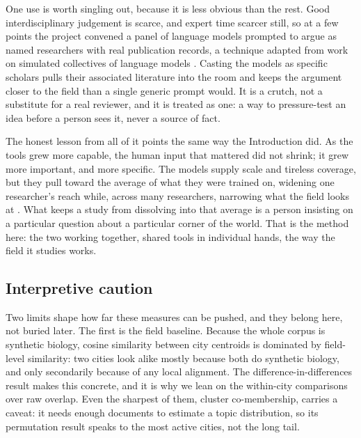 \documentclass[12pt,a4paper]{article}
\begin{document}
	One use is worth singling out, because it is less obvious than the rest. Good
	interdisciplinary judgement is scarce, and expert time scarcer still, so at a few
	points the project convened a panel of language models prompted to argue as named
	researchers with real publication records, a technique adapted from work on
	simulated collectives of language models \citep{evansScience2025}. Casting the models
	as specific scholars pulls their associated literature into the room and keeps the
	argument closer to the field than a single generic prompt would. It is a crutch, not
	a substitute for a real reviewer, and it is treated as one: a way to pressure-test an
	idea before a person sees it, never a source of fact.
	
	The honest lesson from all of it points the same way the Introduction did. As the
	tools grew more capable, the human input that mattered did not shrink; it grew more
	important, and more specific. The models supply scale and tireless coverage, but they
	pull toward the average of what they were trained on, widening one researcher's reach
	while, across many researchers, narrowing what the field looks at
	\citep{haoArtificialIntelligenceTools2026}. What keeps a study from dissolving into
	that average is a person insisting on a particular question about a particular corner
	of the world. That is the method here: the two working together, shared tools in
	individual hands, the way the field it studies works.
	
	\subsection{Interpretive caution}
	
	Two limits shape how far these measures can be pushed, and they belong here, not
	buried later. The first is the field baseline. Because the whole corpus is
	synthetic biology, cosine similarity between city centroids is dominated by
	field-level similarity: two cities look alike mostly because both do synthetic
	biology, and only secondarily because of any local alignment. The
	difference-in-differences result makes this concrete, and it is why we lean on the
	within-city comparisons over raw overlap. Even the sharpest of them, cluster
	co-membership, carries a caveat: it needs enough documents to estimate a topic
	distribution, so its permutation result speaks to the \statClusterNCitiesDense{}
	most active cities, not the long tail.
	
\end{document}
